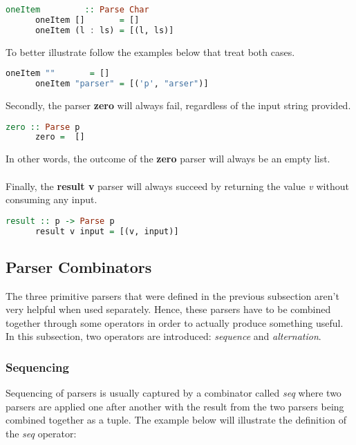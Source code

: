\documentclass[a4paper, onecolumn]{article}
\begin{document}
    
    \begin{lstlisting}[language=Haskell]
      oneItem         :: Parse Char
      oneItem []       = []
      oneItem (l : ls) = [(l, ls)]
    \end{lstlisting}
    
    To better illustrate follow the examples below that treat both cases.
    
    \begin{lstlisting}[language=Haskell]
      oneItem ""       = []
      oneItem "parser" = [('p', "arser")]
    \end{lstlisting}
    Secondly, the parser \textbf{zero} will always fail, regardless of the input string provided. 
    
    \begin{lstlisting}[language=Haskell]
      zero :: Parse p
      zero =  [] 
    \end{lstlisting}
    
    In other words, the outcome of the \textbf{zero} parser will always be an empty list. \\ \\
    Finally, the \textbf{result v} parser will always succeed by returning the value \textit{v} without consuming any input.
    
    \begin{lstlisting}[language=Haskell]
      result :: p -> Parse p
      result v input = [(v, input)]
    \end{lstlisting}
    
    \subsection{Parser Combinators}
    
    The three primitive parsers that were defined in the previous subsection aren't very helpful when used separately. Hence, these parsers have to be combined together through some operators in order to actually produce something useful. In this subsection, two operators are introduced: \textit{sequence} and \textit{alternation}. 
    
    \subsubsection{Sequencing}
    
    Sequencing of parsers is usually captured by a combinator called \textit{seq} where two parsers are applied one after another with the result from the two parsers being combined together as a tuple. The example below will illustrate the definition of the \textit{seq} operator:
    
\end{document}
